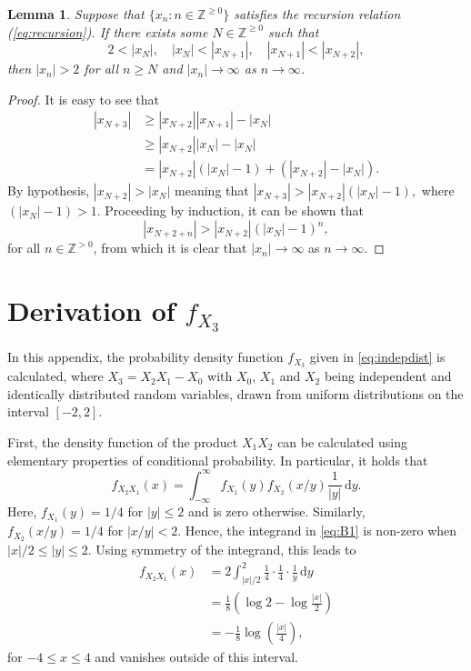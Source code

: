 \documentclass[nofootinbib,prb,amsmath,amssymb,twocolumn,floatfix]{revtex4-2}
\newtheorem{lemma}[theorem]{Lemma}
\theoremstyle{definition}
\newcommand{\de}{\,\mathrm{d}}
\newcommand{\Znn}{\mathbb{Z}^{\geq0}}
\newcommand{\Zp}{\mathbb{Z}^{>0}}
\begin{document}
\begin{lemma} %
	Suppose that $\{x_n:n\in\Znn\}$ satisfies the recursion relation (\ref{eq:recursion}). If there exists some $N\in\Znn$ such that 
	$$ 2<|x_N|, \quad |x_N|<|x_{N+1}|, \quad |x_{N+1}|<|x_{N+2}|,$$
	then $|x_n|>2$ for all $n\geq N$ and $|x_n|\to\infty$ as $n\to\infty$.
\end{lemma}
\begin{proof}
	It is easy to see that 
	\begin{align*}
	|x_{N+3}|&\geq |x_{N+2}||x_{N+1}|-|x_N| \\
	&\geq |x_{N+2}||x_{N}|-|x_N| \\
	& = |x_{N+2}|(|x_{N}|-1)+(|x_{N+2}|-|x_N|).
	\end{align*}
	By hypothesis, $|x_{N+2}|>|x_N|$ meaning that $|x_{N+3}|>|x_{N+2}|(|x_{N}|-1),$
	where $(|x_{N}|-1)>1$. Proceeding by induction, it can be shown that
	\begin{equation}
		|x_{N+2+n}|>|x_{N+2}|(|x_{N}|-1)^n,
	\end{equation}
	for all $n\in\Zp$, from which it is clear that $|x_n|\to\infty$ as $n\to\infty$.
\end{proof}

\section{Derivation of $f_{X_3}$} \label{app:pdf_indep}

In this appendix, the probability density function $f_{X_3}$ given in \eqref{eq:indepdist} is calculated, where $X_3=X_2X_1-X_0$ with $X_0$, $X_1$ and $X_2$ being independent and identically distributed random variables, drawn from uniform distributions on the interval $[-2,2]$.

First, the density function of the product $X_1X_2$ can be calculated using elementary properties of conditional probability. In particular, it holds that
\begin{equation} \label{eq:B1}
	f_{X_2X_1}(x)=\int_{-\infty}^\infty f_{X_1}(y) f_{X_2}(x/y) \frac{1}{|y|} \de y.
\end{equation}
Here, $f_{X_1}(y)=1/4$ for $|y|\leq2$ and is zero otherwise. Similarly, $f_{X_2}(x/y)=1/4$ for $|x/y|<2$. Hence, the integrand in \eqref{eq:B1} is non-zero when $|x|/2\leq |y| \leq 2$. Using symmetry of the integrand, this leads to
\begin{align}
	f_{X_2X_1}(x)&=2\int_{|x|/2}^2 \frac{1}{4}\cdot \frac{1}{4}\cdot \frac{1}{y} \de y \nonumber \\
	&=\frac{1}{8}\left(\log2-\log\frac{|x|}{2}\right) \nonumber \\
	&=-\frac{1}{8}\log\left(\frac{|x|}{4}\right), \label{eq:pdf_X1X2}
\end{align}
for $-4\leq x\leq 4$ and vanishes outside of this interval.
\end{document}

